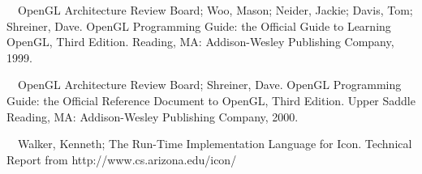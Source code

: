 \documentclass[letterpaper]{article}
\begin{document}
\bigskip

\noindent
[OpenGL99] \ \ OpenGL Architecture Review Board;
Woo, Mason; Neider, Jackie; Davis, Tom; Shreiner, Dave.
OpenGL Programming Guide: the Official Guide to
Learning OpenGL, Third Edition. Reading, MA: Addison-Wesley
Publishing Company, 1999.


\bigskip

\noindent
[OpenGL00] \ \ OpenGL Architecture Review Board; Shreiner, Dave.
OpenGL Programming Guide: the Official Reference Document to
OpenGL, Third Edition. Upper Saddle Reading, MA: Addison-Wesley
Publishing Company, 2000.


\bigskip

\noindent
[Walker94]\ \ Walker, Kenneth; The Run-Time Implementation Language
for Icon. Technical Report from http://www.cs.arizona.edu/icon/
\end{document}
